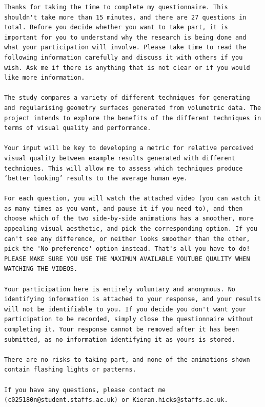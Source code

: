 \documentclass[]{article}
\begin{document}
\begin{Verbatim}[breaklines]
Thanks for taking the time to complete my questionnaire. This shouldn't take more than 15 minutes, and there are 27 questions in total. Before you decide whether you want to take part, it is important for you to understand why the research is being done and what your participation will involve. Please take time to read the following information carefully and discuss it with others if you wish. Ask me if there is anything that is not clear or if you would like more information.

The study compares a variety of different techniques for generating and regularising geometry surfaces generated from volumetric data. The project intends to explore the benefits of the different techniques in terms of visual quality and performance.

Your input will be key to developing a metric for relative perceived visual quality between example results generated with different techniques. This will allow me to assess which techniques produce ‘better looking’ results to the average human eye.

For each question, you will watch the attached video (you can watch it as many times as you want, and pause it if you need to), and then choose which of the two side-by-side animations has a smoother, more appealing visual aesthetic, and pick the corresponding option. If you can't see any difference, or neither looks smoother than the other, pick the 'No preference' option instead. That's all you have to do! PLEASE MAKE SURE YOU USE THE MAXIMUM AVAILABLE YOUTUBE QUALITY WHEN WATCHING THE VIDEOS.

Your participation here is entirely voluntary and anonymous. No identifying information is attached to your response, and your results will not be identifiable to you. If you decide you don't want your participation to be recorded, simply close the questionnaire without completing it. Your response cannot be removed after it has been submitted, as no information identifying it as yours is stored.

There are no risks to taking part, and none of the animations shown contain flashing lights or patterns.

If you have any questions, please contact me (c025180n@student.staffs.ac.uk) or Kieran.hicks@staffs.ac.uk.


\end{Verbatim}
\end{document}

